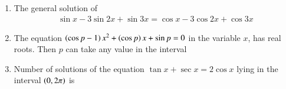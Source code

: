 \documentclass[journal,12pt,twocolumn]{IEEEtran}
\theoremstyle{remark}
\begin{document}
\begin{enumerate}
    \item The general solution of 
	\begin{align*}
		    \sin{x}-3\sin{2x} + \sin{3x} = \cos{x}-3\cos{2x} + \cos{3x}
	\end{align*}
        
        \hfill{}
        \begin{enumerate}[label={(\alph*)}]
        \end{enumerate}


    \item The equation $\left(\cos{p}-1\right)x^2+\left(\cos{p}\right)x+\sin{p}=0$ in the variable $x$, has real roots. Then $p$ can take any value in the interval
        
        \hfill{}
        \begin{enumerate}[label={(\alph*)}]

        \end{enumerate}

    \item Number of solutions of the equation $\tan{x}+\sec{x} = 2\cos{x}$ lying in the interval $\left(0, 2\pi\right)$ is
        

\end{enumerate}
\end{document}
